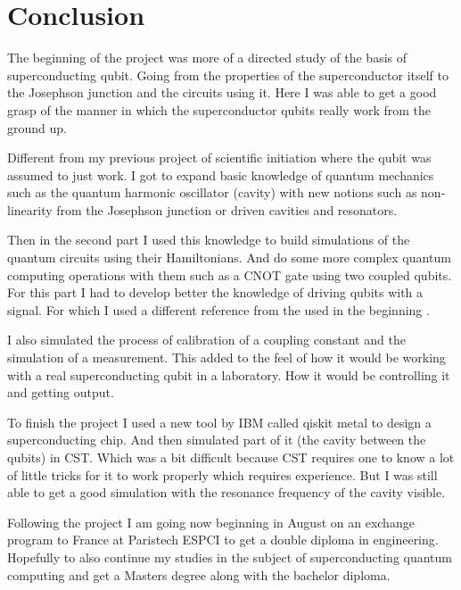 \documentclass[12pt]{article}
\numberwithin{equation}{subsection}
\begin{document}
\section{Conclusion}
The beginning of the project was more of a directed study of the basis of superconducting qubit. Going from the properties of the superconductor itself to the Josephson junction and the circuits using it. Here I was able to get a good grasp of the manner in which the superconductor qubits really work from the ground up. 

Different from my previous project of scientific initiation where the qubit was assumed to just work. I got to expand basic knowledge of quantum mechanics such as the quantum harmonic oscillator (cavity) with new notions such as non-linearity from the Josephson junction or driven cavities and resonators.

Then in the second part I used this knowledge to build simulations of the quantum circuits using their Hamiltonians. And do some more complex quantum computing operations with them such as a CNOT gate using two coupled qubits. For this part I had to develop better the knowledge of driving qubits with a signal. For which I used a different reference from the used in the beginning  \cite{2019krantz}. 

I also simulated the process of calibration of a coupling constant and the simulation of a measurement. This added to the feel of how it would be working with a real superconducting qubit in a laboratory. How it would be controlling it and getting output.

To finish the project I used a new tool by IBM called qiskit metal to design a superconducting chip. And then simulated part of it (the cavity between the qubits) in CST. Which was a bit difficult because CST requires one to know a lot of little tricks for it to work properly which requires experience. But I was still able to get a good simulation with the resonance frequency of the cavity visible.

Following the project I am going now beginning in August on an exchange program to France at Paristech ESPCI to get a double diploma in engineering. Hopefully to also continue my studies in the subject of superconducting quantum computing and get a Masters degree along with the bachelor diploma.

\end{document}
